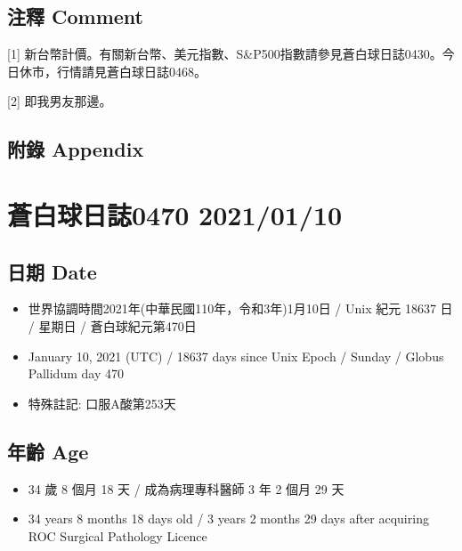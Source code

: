 \documentclass[a5paper, 10pt
]{book}
\providecommand{\tightlist}{%
  \setlength{\itemsep}{0pt}\setlength{\parskip}{0pt}}
\begin{document}
\hypertarget{ux6ce8ux91cb-comment-39}{%
\subsection{注釋 Comment}\label{ux6ce8ux91cb-comment-39}}

{[}1{]}
新台幣計價。有關新台幣、美元指數、S\&P500指數請參見蒼白球日誌0430。今日休市，行情請見蒼白球日誌0468。

{[}2{]} 即我男友那邊。

\hypertarget{ux9644ux9304-appendix-39}{%
\subsection{附錄 Appendix}\label{ux9644ux9304-appendix-39}}

\hypertarget{ux84bcux767dux7403ux65e5ux8a8c0470-20210110}{%
\section{蒼白球日誌0470
2021/01/10}\label{ux84bcux767dux7403ux65e5ux8a8c0470-20210110}}

\hypertarget{ux65e5ux671f-date-40}{%
\subsection{日期 Date}\label{ux65e5ux671f-date-40}}

\begin{itemize}
\tightlist
\item
  世界協調時間2021年(中華民國110年，令和3年)1月10日 / Unix 紀元 18637 日
  / 星期日 / 蒼白球紀元第470日
\item
  January 10, 2021 (UTC) / 18637 days since Unix Epoch / Sunday / Globus
  Pallidum day 470
\item
  特殊註記: 口服A酸第253天
\end{itemize}

\hypertarget{ux5e74ux9f61-age-40}{%
\subsection{年齡 Age}\label{ux5e74ux9f61-age-40}}

\begin{itemize}
\tightlist
\item
  34 歲 8 個月 18 天 / 成為病理專科醫師 3 年 2 個月 29 天
\item
  34 years 8 months 18 days old / 3 years 2 months 29 days after
  acquiring ROC Surgical Pathology Licence
\end{itemize}
\end{document}
